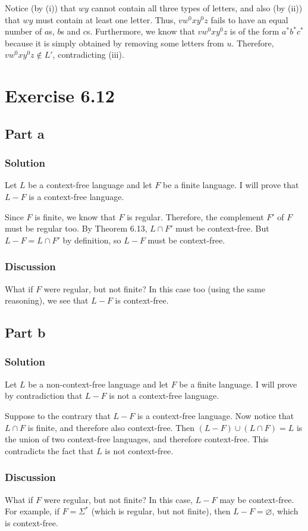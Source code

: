 \documentclass[12pt]{article}
\renewcommand{\emptyset}{\varnothing}
\begin{document}
      Notice (by (i)) that $wy$ cannot contain all three types of letters, and also (by (ii)) that $wy$ must contain at least one letter. Thus, $vw^0xy^0z$ fails to have an equal number of $a$s, $b$s and $c$s. Furthermore, we know that $vw^0xy^0z$ is of the form $a^*b^*c^*$ because it is simply obtained by removing some letters from $u$. Therefore, $vw^0xy^0z\notin L'$, contradicting (iii).
\section{Exercise 6.12}
  \subsection{Part a}
    \subsubsection{Solution}
      Let $L$ be a context-free language and let $F$ be a finite language. I will prove that $L-F$ is a context-free language.

      Since $F$ is finite, we know that $F$ is regular. Therefore, the complement $F'$ of $F$ must be regular too. By Theorem 6.13, $L\cap F'$ must be context-free. But $L-F=L\cap F'$ by definition, so $L-F$ must be context-free.
    \subsubsection{Discussion}
      What if $F$ were regular, but not finite? In this case too (using the same reasoning), we see that $L-F$ is context-free.
  \subsection{Part b}
    \subsubsection{Solution}
      Let $L$ be a non-context-free language and let $F$ be a finite language. I will prove by contradiction that $L-F$ is not a context-free language.

      Suppose to the contrary that $L-F$ is a context-free language. Now notice that $L\cap F$ is finite, and therefore also context-free. Then $(L-F)\cup(L\cap F)=L$ is the union of two context-free languages, and therefore context-free. This contradicts the fact that $L$ is not context-free.
    \subsubsection{Discussion}
      What if $F$ were regular, but not finite? In this case, $L-F$ may be context-free. For example, if $F=\Sigma^*$ (which is regular, but not finite), then $L-F=\emptyset$, which is context-free.
\end{document}
